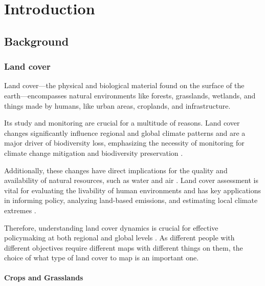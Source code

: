 \chapter[Introduction]{Introduction}
\label{cha:Chapter1}
\vspace*{\fill}


\newpage

\section{Background}


\subsection*{Land cover}

    Land cover---the physical and biological material found on the surface of the earth---encompasses natural environments like forests, grasslands, wetlands, and things made by humans, like urban areas, croplands, and infrastructure. 
    
    Its study and monitoring are crucial for a multitude of reasons. Land cover changes significantly influence regional and global climate patterns and are a major driver of biodiversity loss, emphasizing the necessity of monitoring for climate change mitigation and biodiversity preservation \citep{pielke2002influence, houghton2012carbon, sala2000global, cbd2016indicators}. 
    
    Additionally, these changes have direct implications for the quality and availability of natural resources, such as water and air \citep{foley2005global}. Land cover assessment is vital for evaluating the livability of human environments \citep{levering2024landscape} and has key applications in informing policy, analyzing land-based emissions, and estimating local climate extremes \citep{duveiller2020, hong2021luemissions, sy2020}. 
    
    Therefore, understanding land cover dynamics is crucial for effective policymaking at both regional and global levels \citep{liu2020assessing, trisurat2019land, shumba2020effectiveness}. As different people with different objectives require different maps with different things on them, the choice of what type of land cover to map is an important one. 

    \subsubsection*{Crops and Grasslands}

